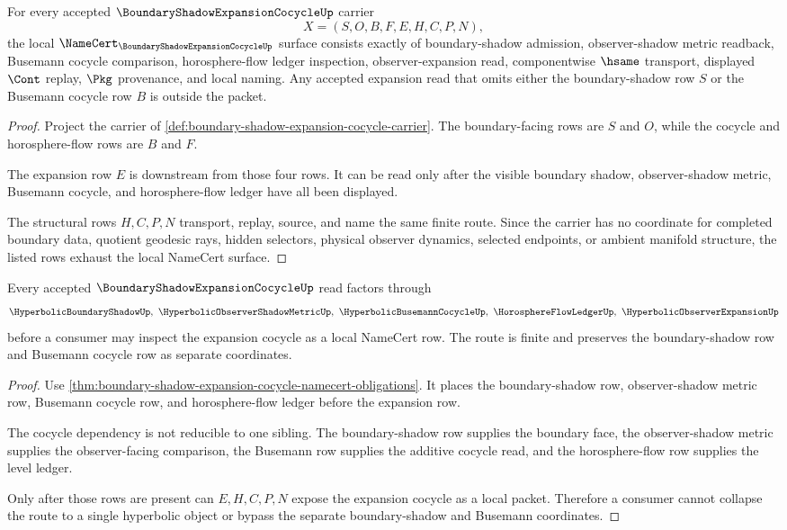 \begin{theorem}
\label{thm:boundary-shadow-expansion-cocycle-namecert-obligations}
For every accepted $\BoundaryShadowExpansionCocycleUp$ carrier
$$
X=(S,O,B,F,E,H,C,P,N),
$$
the local $\NameCert_{\BoundaryShadowExpansionCocycleUp}$ surface consists exactly of boundary-shadow admission, observer-shadow metric readback, Busemann cocycle comparison, horosphere-flow ledger inspection, observer-expansion read, componentwise $\hsame$ transport, displayed $\Cont$ replay, $\Pkg$ provenance, and local naming. Any accepted expansion read that omits either the boundary-shadow row $S$ or the Busemann cocycle row $B$ is outside the packet.
\end{theorem}
\begin{proof}
Project the carrier of \autoref{def:boundary-shadow-expansion-cocycle-carrier}. The boundary-facing rows are $S$ and $O$, while the cocycle and horosphere-flow rows are $B$ and $F$.

The expansion row $E$ is downstream from those four rows. It can be read only after the visible boundary shadow, observer-shadow metric, Busemann cocycle, and horosphere-flow ledger have all been displayed.

The structural rows $H,C,P,N$ transport, replay, source, and name the same finite route. Since the carrier has no coordinate for completed boundary data, quotient geodesic rays, hidden selectors, physical observer dynamics, selected endpoints, or ambient manifold structure, the listed rows exhaust the local NameCert surface.
\end{proof}

\begin{theorem}
\label{thm:boundary-shadow-expansion-cocycle-dependency-route}
Every accepted $\BoundaryShadowExpansionCocycleUp$ read factors through
$$
\HyperbolicBoundaryShadowUp,\ \HyperbolicObserverShadowMetricUp,\ \HyperbolicBusemannCocycleUp,\ \HorosphereFlowLedgerUp,\ \HyperbolicObserverExpansionUp
$$
before a consumer may inspect the expansion cocycle as a local NameCert row. The route is finite and preserves the boundary-shadow row and Busemann cocycle row as separate coordinates.
\end{theorem}
\begin{proof}
Use \autoref{thm:boundary-shadow-expansion-cocycle-namecert-obligations}. It places the boundary-shadow row, observer-shadow metric row, Busemann cocycle row, and horosphere-flow ledger before the expansion row.

The cocycle dependency is not reducible to one sibling. The boundary-shadow row supplies the boundary face, the observer-shadow metric supplies the observer-facing comparison, the Busemann row supplies the additive cocycle read, and the horosphere-flow row supplies the level ledger.

Only after those rows are present can $E,H,C,P,N$ expose the expansion cocycle as a local packet. Therefore a consumer cannot collapse the route to a single hyperbolic object or bypass the separate boundary-shadow and Busemann coordinates.
\end{proof}

